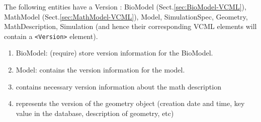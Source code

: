The following entities have a Version : BioModel (Sect.\ref{sec:BioModel-VCML}),
MathModel (Sect.\ref{sec:MathModel-VCML}), Model, SimulationSpec, Geometry,
MathDescription, Simulation (and hence their corresponding VCML elements will contain a \verb!<Version>! element).
\begin{enumerate}
  \item BioModel: (require) store version information for the BioModel. 
  
  \item Model: contains the version information for the model.
  
  
  \item  contains necessary version information about the math description

  \item represents the version of the geometry object (creation date
and time, key value in the database, description of geometry, etc) 
  
\end{enumerate}

